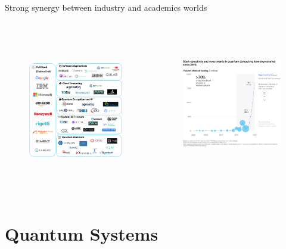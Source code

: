 \documentclass[aspectratio=169, 10pt, xcolor={svgnames}, hyperref={linkcolor=black}]{beamer}
\begin{document}
 \begin{frame}[fragile]{Strong synergy between industry and academics worlds}

     \begin{columns}
         \column{7cm}
     \begin{figure}
         \includegraphics[height=7cm]{figures/companies.png}
     \end{figure}
     \column{7cm}
     \begin{figure}
         \includegraphics[height=6.5cm]{figures/startup.png}
     \end{figure}
     \end{columns}
 \end{frame}

\section{Quantum Systems}
\end{document}
